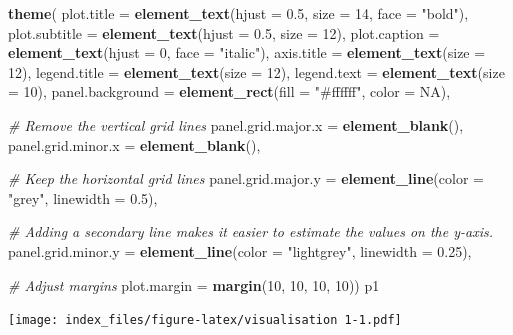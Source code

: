 \documentclass[
]{article}
\newenvironment{Shaded}{\begin{snugshade}}{\end{snugshade}}
\newcommand{\AttributeTok}[1]{\textcolor[rgb]{0.13,0.29,0.53}{#1}}
\newcommand{\CommentTok}[1]{\textcolor[rgb]{0.56,0.35,0.01}{\textit{#1}}}
\newcommand{\ConstantTok}[1]{\textcolor[rgb]{0.56,0.35,0.01}{#1}}
\newcommand{\DecValTok}[1]{\textcolor[rgb]{0.00,0.00,0.81}{#1}}
\newcommand{\FloatTok}[1]{\textcolor[rgb]{0.00,0.00,0.81}{#1}}
\newcommand{\FunctionTok}[1]{\textcolor[rgb]{0.13,0.29,0.53}{\textbf{#1}}}
\newcommand{\NormalTok}[1]{#1}
\newcommand{\StringTok}[1]{\textcolor[rgb]{0.31,0.60,0.02}{#1}}
\begin{document}
\begin{Shaded}
\begin{Highlighting}[]
  
  \FunctionTok{theme}\NormalTok{(}
    \AttributeTok{plot.title =} \FunctionTok{element\_text}\NormalTok{(}\AttributeTok{hjust =} \FloatTok{0.5}\NormalTok{, }\AttributeTok{size =} \DecValTok{14}\NormalTok{, }\AttributeTok{face =} \StringTok{"bold"}\NormalTok{),}
    \AttributeTok{plot.subtitle =} \FunctionTok{element\_text}\NormalTok{(}\AttributeTok{hjust =} \FloatTok{0.5}\NormalTok{, }\AttributeTok{size =} \DecValTok{12}\NormalTok{),}
    \AttributeTok{plot.caption =} \FunctionTok{element\_text}\NormalTok{(}\AttributeTok{hjust =} \DecValTok{0}\NormalTok{, }\AttributeTok{face =} \StringTok{"italic"}\NormalTok{),}
    \AttributeTok{axis.title =} \FunctionTok{element\_text}\NormalTok{(}\AttributeTok{size =} \DecValTok{12}\NormalTok{),}
    \AttributeTok{legend.title =} \FunctionTok{element\_text}\NormalTok{(}\AttributeTok{size =} \DecValTok{12}\NormalTok{),}
    \AttributeTok{legend.text =} \FunctionTok{element\_text}\NormalTok{(}\AttributeTok{size =} \DecValTok{10}\NormalTok{),}
    \AttributeTok{panel.background =} \FunctionTok{element\_rect}\NormalTok{(}\AttributeTok{fill =} \StringTok{"\#ffffff"}\NormalTok{, }\AttributeTok{color =} \ConstantTok{NA}\NormalTok{),}
    
    \CommentTok{\# Remove the vertical grid lines}
    \AttributeTok{panel.grid.major.x =} \FunctionTok{element\_blank}\NormalTok{(),}
    \AttributeTok{panel.grid.minor.x =} \FunctionTok{element\_blank}\NormalTok{(),}
    
    \CommentTok{\# Keep the horizontal grid lines}
    \AttributeTok{panel.grid.major.y =} \FunctionTok{element\_line}\NormalTok{(}\AttributeTok{color =} \StringTok{"grey"}\NormalTok{, }\AttributeTok{linewidth =} \FloatTok{0.5}\NormalTok{),}
    
    \CommentTok{\# Adding a secondary line makes it easier to estimate the values on the y{-}axis. }
    \AttributeTok{panel.grid.minor.y =} \FunctionTok{element\_line}\NormalTok{(}\AttributeTok{color =} \StringTok{"lightgrey"}\NormalTok{, }\AttributeTok{linewidth =} \FloatTok{0.25}\NormalTok{),}
   
     \CommentTok{\# Adjust margins}
    \AttributeTok{plot.margin =} \FunctionTok{margin}\NormalTok{(}\DecValTok{10}\NormalTok{, }\DecValTok{10}\NormalTok{, }\DecValTok{10}\NormalTok{, }\DecValTok{10}\NormalTok{))}
\NormalTok{p1}
\end{Highlighting}
\end{Shaded}

\texttt{[image: index\_files/figure-latex/visualisation 1-1.pdf]}
\end{document}
